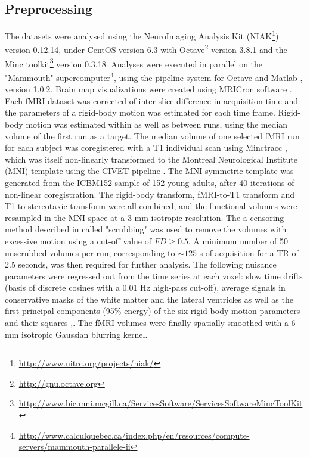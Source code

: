 \documentclass[authoryear]{elsarticle}
\begin{document}
\subsection{Preprocessing}\label{Preprocessing}
The datasets were analysed using the NeuroImaging Analysis Kit (NIAK\footnote{\url{http://www.nitrc.org/projects/niak/}}) version 0.12.14, under CentOS version 6.3 with Octave\footnote{\url{http://gnu.octave.org}} version 3.8.1 and the Minc toolkit\footnote{\url{http://www.bic.mni.mcgill.ca/ServicesSoftware/ServicesSoftwareMincToolKit}} version 0.3.18. Analyses were executed in parallel on the "Mammouth" supercomputer\footnote{\url{http://www.calculquebec.ca/index.php/en/resources/compute-servers/mammouth-parallele-ii}}, using the pipeline system for Octave and Matlab \citep{Bellec2010}, version 1.0.2. Brain map visualizations were created using MRICron software \cite{Rorden2007}. Each fMRI dataset was corrected of inter-slice difference in acquisition time and the parameters of a rigid-body motion was estimated for each time frame. Rigid-body motion was estimated within as well as between runs, using the median volume of the first run as a target. The median volume of one selected fMRI run for each subject 
was 
coregistered with a T1 individual scan using Minctracc \citep{Collins1998}, which was itself non-linearly transformed to the Montreal Neurological Institute (MNI) template \citep{Fonov2011} using the CIVET pipeline \citep{Zijdenbos2002}. The MNI symmetric template was generated from the ICBM152 sample of 152 young adults, after 40 iterations of non-linear coregistration. The rigid-body transform, fMRI-to-T1 transform and T1-to-stereotaxic transform were all combined, and the functional volumes were resampled in the MNI space at a 3 mm isotropic resolution. The a censoring method described in \citep{Power2012} called "scrubbing" was used to remove the volumes with excessive motion using a cut-off value of $FD\geq0.5$. A minimum number of 50 unscrubbed volumes per run, corresponding to $\sim 125$ s of acquisition for a TR of 2.5 seconds, was then required for further analysis. The following nuisance parameters were regressed out from the time series at each voxel: slow time drifts (basis of discrete cosines 
with a 0.01 Hz high-pass cut-off), average signals in conservative masks of the white matter and the lateral ventricles as well as the first principal components (95\% energy) of the six rigid-body motion parameters and their squares \citep{Lund2006},\citep{Giove2009}. The fMRI volumes were finally spatially smoothed with a 6 mm isotropic Gaussian blurring kernel. 
\end{document}
